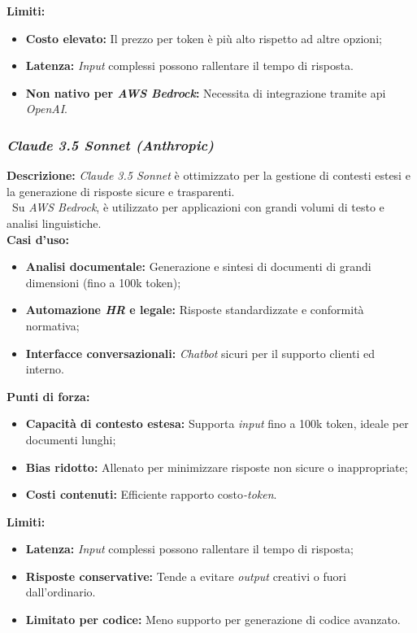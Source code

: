 \noindent \textbf{Limiti:}
\begin{itemize}
    \item \textbf{Costo elevato:} Il prezzo per \gls{token} è più alto rispetto ad altre opzioni;
    \item \textbf{Latenza:} \textit{Input} complessi possono rallentare il tempo di risposta.
    \item \textbf{Non nativo per \textit{AWS Bedrock}:} Necessita di integrazione tramite \gls{api} \textit{OpenAI}.
\end{itemize}

\vspace{1.5cm}
\subsubsection{\textit{Claude 3.5 Sonnet (Anthropic)}}

\noindent \textbf{Descrizione:}
\textit{Claude 3.5 Sonnet} è ottimizzato per la gestione di contesti estesi e la generazione di risposte sicure e trasparenti. \\\
Su \textit{AWS Bedrock}, è utilizzato per applicazioni con grandi volumi di testo e analisi linguistiche. \\

\noindent \textbf{Casi d’uso:}
\begin{itemize}
    \item \textbf{Analisi documentale:} Generazione e sintesi di documenti di grandi dimensioni (fino a 100k \gls{token});
    \item \textbf{Automazione \textit{HR} e legale:} Risposte standardizzate e conformità normativa;
    \item \textbf{Interfacce conversazionali:} \textit{Chatbot} sicuri per il supporto clienti ed interno.
\end{itemize}

\noindent \textbf{Punti di forza:}
\begin{itemize}
    \item \textbf{Capacità di contesto estesa:} Supporta \textit{input} fino a 100k \gls{token}, ideale per documenti lunghi;
    \item \textbf{Bias ridotto:} Allenato per minimizzare risposte non sicure o inappropriate;
    \item \textbf{Costi contenuti:} Efficiente rapporto costo\textit{-token}.
\end{itemize}

\noindent \textbf{Limiti:}
\begin{itemize}
    \item \textbf{Latenza:} \textit{Input} complessi possono rallentare il tempo di risposta;
    \item \textbf{Risposte conservative:} Tende a evitare \textit{output} creativi o fuori dall’ordinario.
    \item \textbf{Limitato per codice:} Meno supporto per generazione di codice avanzato.
\end{itemize}

